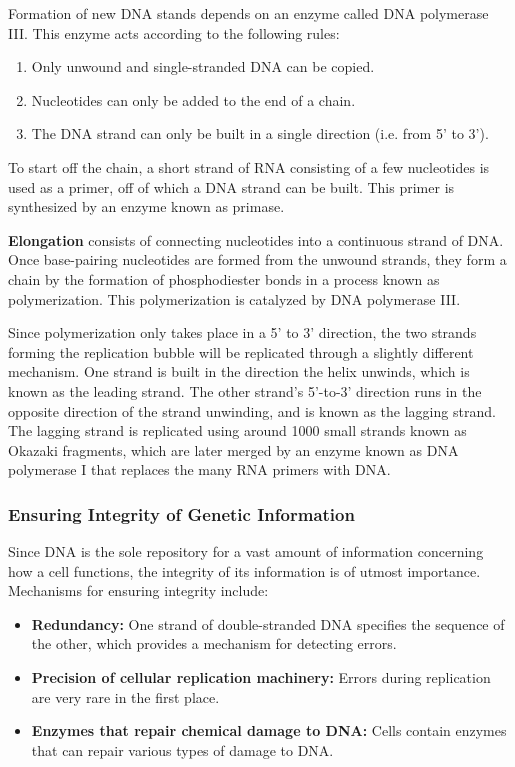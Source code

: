 \documentclass[12pt,titlepage]{article}
\begin{document}
          Formation of new DNA stands depends on an enzyme called DNA polymerase III. This enzyme acts according to the following rules:
          \begin{enumerate}
            \item Only unwound and single-stranded DNA can be copied.
            \item Nucleotides can only be added to the end of a chain.
            \item The DNA strand can only be built in a single direction (i.e. from 5' to 3').
          \end{enumerate}
          To start off the chain, a short strand of RNA consisting of a few nucleotides is used as a primer, off of which a DNA strand can be built. This primer is
          synthesized by an enzyme known as primase.

          \textbf{Elongation} consists of connecting nucleotides into a continuous strand of DNA. Once base-pairing nucleotides are formed from the unwound strands,
          they form a chain by the formation of phosphodiester bonds in a process known as polymerization. This polymerization is catalyzed by DNA polymerase III.

          Since polymerization only takes place in a 5' to 3' direction, the two strands forming the replication bubble will be replicated through a slightly different
          mechanism. One strand is built in the direction the helix unwinds, which is known as the leading strand. The other strand's 5'-to-3' direction runs in the
          opposite direction of the strand unwinding, and is known as the lagging strand. The lagging strand is replicated using around 1000 small strands known as
          Okazaki fragments, which are later merged by an enzyme known as DNA polymerase I that replaces the many RNA primers with DNA.

        \subsubsection{Ensuring Integrity of Genetic Information}
          Since DNA is the sole repository for a vast amount of information concerning how a cell functions, the integrity of its information is of utmost importance.
          Mechanisms for ensuring integrity include:
          \begin{itemize}
            \item \textbf{Redundancy:} One strand of double-stranded DNA specifies the sequence of the other, which provides a mechanism for detecting errors.
            \item \textbf{Precision of cellular replication machinery:} Errors during replication are very rare in the first place.
            \item \textbf{Enzymes that repair chemical damage to DNA:} Cells contain enzymes that can repair various types of damage to DNA.
          \end{itemize}
\end{document}
